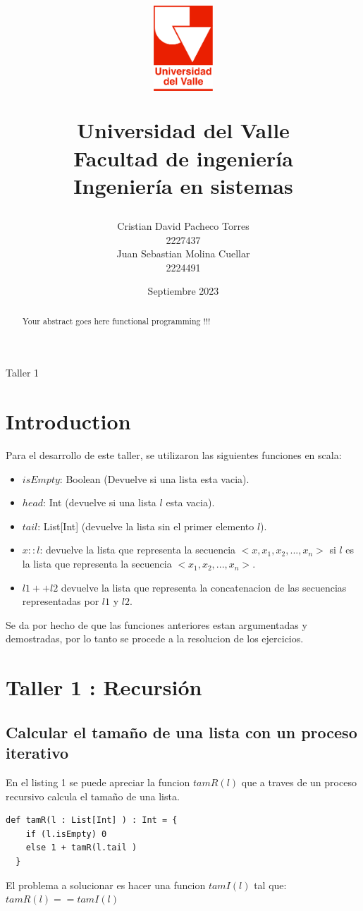 \documentclass[12pt, a4paper]{article}
\title{
  \begin{figure}[th]
    \centering
    \includegraphics[width=0.2\textwidth]{Univalle}
  \end{figure}
  \textbf{Universidad del Valle
    \\{\Large Facultad de ingeniería}
  \\{\large Ingeniería en sistemas}}}
\author{Cristian David Pacheco Torres
  \\ 2227437
  \\ Juan Sebastian Molina Cuellar
  \\ 2224491}
\date{Septiembre 2023}
\begin{document}
\maketitle
Taller 1
\newpage{}
\begin{abstract}
Your abstract goes here functional programming !!!
\end{abstract}
\newpage{}
\tableofcontents
\newpage{}
\section{Introduction}
Para el desarrollo de este taller, se utilizaron las siguientes funciones en scala: \\
\begin{itemize}
  \item $isEmpty$: Boolean (Devuelve si una lista esta vacia).
  \item $head$: Int (devuelve si una lista $l$ esta vacia).
  \item $tail$: List[Int] (devuelve la lista sin el primer elemento $l$).
  \item $x::l$: devuelve la lista que representa la secuencia $<x,x_1,x_2,...,x_n>$ si $l$ es la lista que representa
  la secuencia $<x_1,x_2,...,x_n>$.
  \item $l1 ++ l2$ devuelve la lista que representa la concatenacion de las secuencias representadas por $l1$ y $l2$.
\end{itemize}
Se da por hecho de que las funciones anteriores estan argumentadas y demostradas, por lo tanto se procede a la resolucion de los ejercicios.
\section{Taller 1 : Recursión}
\subsection{Calcular el tamaño de una lista con un proceso iterativo}
En el listing 1 se puede apreciar la funcion $tamR(l)$ que a traves de un proceso recursivo calcula el tamaño de una lista.
\begin{lstlisting}[style=scalaStyle, caption=Calcula el tamaño de una lista con un proceso recursivo]
  def tamR(l : List[Int] ) : Int = {
    if (l.isEmpty) 0
    else 1 + tamR(l.tail )
  }
\end{lstlisting}
El problema a solucionar es hacer una funcion $tamI(l)$ tal que: \\
$tamR(l) == tamI(l)$
\end{document}
